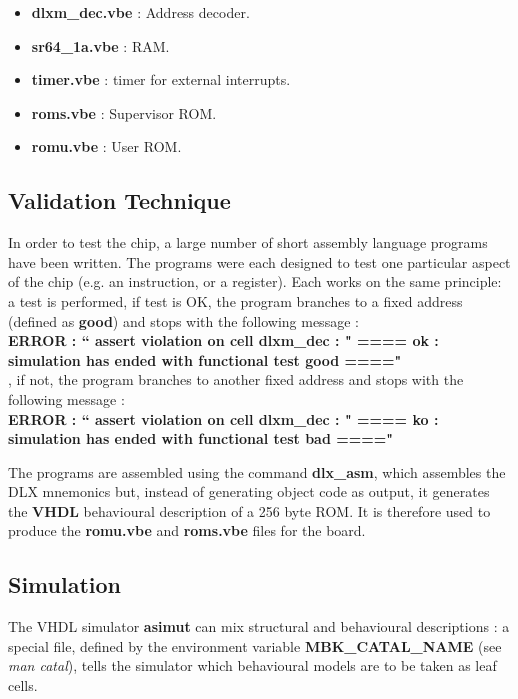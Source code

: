 \begin {itemize}
\item {\bf dlxm\_dec.vbe} : Address decoder.
\item {\bf sr64\_1a.vbe} : RAM.
\item {\bf timer.vbe} : timer for external interrupts.
\item {\bf roms.vbe} : Supervisor ROM.
\item {\bf romu.vbe} : User ROM.
\end{itemize}

	\subsection{Validation Technique}

In order to test the chip, a large number of short assembly language
programs have been written. The programs were each designed to test
one particular aspect of the chip (e.g. an instruction, or a
register). Each works on the same principle: a test is performed, if
test is OK, the program branches to a fixed address (defined as {\bf
good}) and stops with the following message :\\
{\bf ERROR : `` assert violation on cell dlxm\_dec : " ==== ok :
simulation has ended with functional test good ===="\\}
, if not, the program branches to another fixed address and stops with
the following message :\\
{\bf ERROR : `` assert violation on cell dlxm\_dec : " ==== ko :
simulation has ended with functional test bad ===="\\}

The programs are assembled using the command {\bf dlx\_asm}, which assembles the DLX mnemonics but, instead of generating object code as output, it generates the {\bf VHDL} behavioural description of a 256 byte ROM. It is therefore used to produce the {\bf romu.vbe} and {\bf roms.vbe} files for the board.



    	\subsection{Simulation}


The VHDL simulator {\bf asimut} can mix structural and behavioural descriptions :
a special file,
defined by the environment variable {\bf MBK\_CATAL\_NAME} (see {\em man catal}), tells the simulator which behavioural models are to be taken as leaf cells. 

